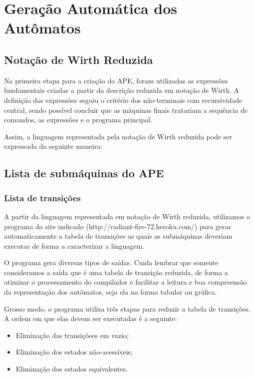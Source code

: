 \documentclass[12pt,oneside,a4paper,english]{abntex2}
\begin{document}
\chapter{Geração Automática dos Autômatos}
  \section{Notação de Wirth Reduzida}

    Na primeira etapa para a criação do APE, foram utilizadas as expressões fundamentais criadas a partir da descrição reduzida em notação de Wirth. A definição das expressões seguiu o critério dos não-terminais com recursividade central, sendo possível concluir que as máquinas finais tratariam a sequência de comandos, as expressões e o programa principal.


    Assim, a linguagem representada pela notação de Wirth reduzida pode ser expressada da seguinte maneira:
    

    

  \section{Lista de submáquinas do APE}
    \subsection{Lista de transições}

      A partir da linguagem representada em notação de Wirth reduzida, utilizamos o programa do site indicado (http://radiant-fire-72.heroku.com/) para gerar automaticamente a tabela de transições as quais as submáquinas deveriam executar de forma a caracterizar a linguagem.


      O programa gera diversas tipos de saídas. Cuida lembrar que somente consideramos a saída que é uma tabela de transição reduzida, de forma a otimizar o processamento do compilador e facilitar a leitura e boa compreensão da representação dos autômatos, seja ela na forma tabular ou gráfica.


      Grosso modo, o programa utiliza três etapas para reduzir a tabela de transições. A ordem em que elas devem ser executadas é a seguinte:


      \begin{itemize}
        \item Eliminação das transiçõees em vazio;
        \item Eliminação dos estados não-acessíveis;
        \item Eliminação dos estados equivalentes.
      \end{itemize}
\end{document}
